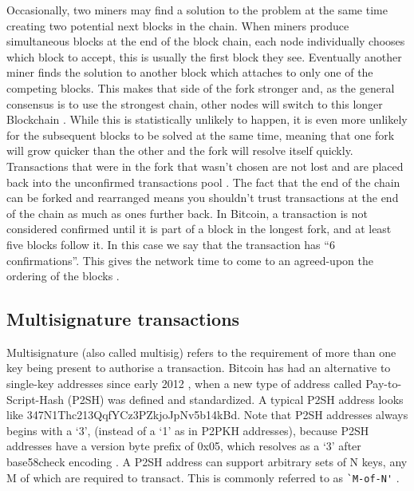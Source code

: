 \documentclass{article}
\begin{document}
Occasionally, two miners may find a solution to the problem at the same time creating two potential next blocks in the chain. When miners produce simultaneous blocks at the end of the block chain, each node individually chooses which block to accept, this is usually the first block they see. Eventually another miner finds the solution to another block which attaches to only one of the competing blocks. This makes that side of the fork stronger and, as the general consensus is to use the strongest chain, other nodes will switch to this longer Blockchain \citep{20_developer_guide_bitcoin_2016}. While this is statistically unlikely to happen, it is even more unlikely for the subsequent blocks to be solved at the same time, meaning that one fork will grow quicker than the other and the fork will resolve itself quickly. Transactions that were in the fork that wasn't chosen are not lost and are placed back into the unconfirmed transactions pool \citep{4_driscoll_2016}. The fact that the end of the chain can be forked and rearranged means you shouldn't trust transactions at the end of the chain as much as ones further back. In Bitcoin, a transaction is not considered confirmed until it is part of a block in the longest fork, and at least five blocks follow it. In this case we say that the transaction has ``6 confirmations''. This gives the network time to come to an agreed-upon the ordering of the blocks \citep{35_nielsen_2013}.


    \subsection{Multisignature transactions}
    
    Multisignature (also called multisig) refers to the requirement of more than one key being present to authorise a transaction. Bitcoin has had an alternative to single-key addresses since early 2012 \citep{36_multisignature_bitcoin_wiki_2016}, when a new type of address called Pay-to-Script-Hash (P2SH) was defined and standardized. A typical P2SH address looks like 347N1Thc213QqfYCz3PZkjoJpNv5b14kBd. Note that P2SH addresses always begins with a `3', (instead of a `1' as in P2PKH addresses), because P2SH addresses have a version byte prefix of 0x05, which resolves as a `3' after base58check encoding \citep{39_pour_2014}. A P2SH address can support arbitrary sets of N keys, any M of which are required to transact. This is commonly referred to as \verb|`M-­of-­N'| \citep{37_davenport_2015}.
\end{document}
